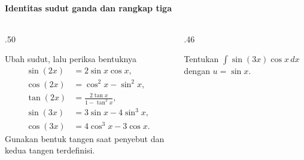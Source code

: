 \documentclass{../../kalkulus-ppt}
\begin{document}
\begin{frame}{\insertsection}
    \framesubtitle{Identitas sudut ganda dan rangkap tiga}
    \begin{columns}[t,onlytextwidth]
        \begin{column}{.50\textwidth}
            \begin{block}{Ubah sudut, lalu periksa bentuknya}
                \[
                    \begin{aligned}
                        \sin(2x)&=2\sin x\cos x,\\
                        \cos(2x)&=\cos^2x-\sin^2x,\\
                        \tan(2x)&=\frac{2\tan x}{1-\tan^2x},\\
                        \sin(3x)&=3\sin x-4\sin^3x,\\
                        \cos(3x)&=4\cos^3x-3\cos x.
                    \end{aligned}
                \]
                Gunakan bentuk tangen saat penyebut dan kedua tangen terdefinisi.
            \end{block}
        \end{column}
        \begin{column}{.46\textwidth}
            \begin{contoh}
                Tentukan $\int\sin(3x)\cos x\,dx$ dengan $u=\sin x$.
            \end{contoh}
        \end{column}
    \end{columns}
\end{frame}
\end{document}
